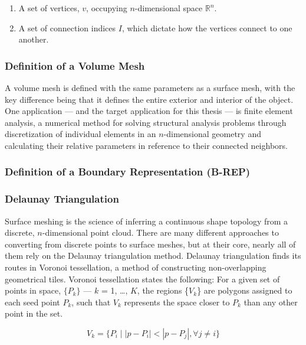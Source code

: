\documentclass[12pt]{drexelthesis}
\let\Oldsubsubsection\subsubsection
\renewcommand{\subsubsection}{\FloatBarrier\Oldsubsubsection}
\begin{document}
\begin{enumerate}
	\item A set of vertices, $v$, occupying $n$-dimensional space $\mathbb{R}^{n}$.
	\item A set of connection indices $I$, which dictate how the vertices connect to one another.
\end{enumerate}



\subsubsection{Definition of a Volume Mesh}
A volume mesh is defined with the same parameters as a surface mesh, with the key difference being that it defines the entire exterior and interior of the object.
One application --- and the target application for this thesis --- is finite element analysis, a numerical method for solving structural analysis problems through discretization of individual elements in an $n$-dimensional geometry and calculating their relative parameters in reference to their connected neighbors.

\subsubsection{Definition of a Boundary Representation (B-REP)}



\subsubsection{Delaunay Triangulation}
Surface meshing is the science of inferring a continuous shape topology from a discrete, $n$-dimensional point cloud. There are many different approaches to converting from discrete points to surface meshes, but at their core, nearly all of them rely on the Delaunay triangulation method.
Delaunay triangulation finds its routes in Voronoi tessellation, a method of constructing non-overlapping geometrical tiles. Voronoi tessellation states the following:
For a given set of points in space, $\{P_{k}\}$ --- $k$ = 1, \ldots, $K$, the regions \{$V_{k}$\} are polygons assigned to each seed point $P_{k}$, such that $V_{k}$ represents the space closer to $P_{k}$ than any other point in the set.

\begin{equation}
	V_{k} = \{P_{i} \mid |p - P_{i}| < |p - P_{j}|, \forall j \neq i \}
\end{equation}
\end{document}
